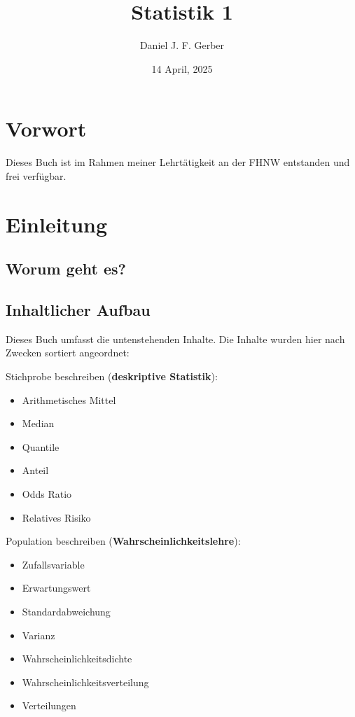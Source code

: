 \documentclass[
]{book}
\title{Statistik 1}
\author{Daniel J. F. Gerber}
\date{14 April, 2025}
\providecommand{\tightlist}{%
  \setlength{\itemsep}{0pt}\setlength{\parskip}{0pt}}
\theoremstyle{definition}
\theoremstyle{definition}
\theoremstyle{definition}
\theoremstyle{definition}
\theoremstyle{remark}
\begin{document}
\maketitle

{
\setcounter{tocdepth}{1}
\tableofcontents
}
\chapter*{Vorwort}\label{vorwort}

Dieses Buch ist im Rahmen meiner Lehrtätigkeit an der FHNW entstanden und frei verfügbar.

\chapter{Einleitung}\label{einleitung}

\section{Worum geht es?}\label{worum-geht-es}

\section{Inhaltlicher Aufbau}\label{inhaltlicher-aufbau}

Dieses Buch umfasst die untenstehenden Inhalte. Die Inhalte wurden hier nach Zwecken sortiert angeordnet:

Stichprobe beschreiben (\textbf{deskriptive Statistik}):

\begin{itemize}
\tightlist
\item
  Arithmetisches Mittel
\item
  Median
\item
  Quantile
\item
  Anteil
\item
  Odds Ratio
\item
  Relatives Risiko
\end{itemize}

Population beschreiben (\textbf{Wahrscheinlichkeitslehre}):

\begin{itemize}
\tightlist
\item
  Zufallsvariable
\item
  Erwartungswert
\item
  Standardabweichung
\item
  Varianz
\item
  Wahrscheinlichkeitsdichte
\item
  Wahrscheinlichkeitsverteilung
\item
  Verteilungen
\end{itemize}
\end{document}
